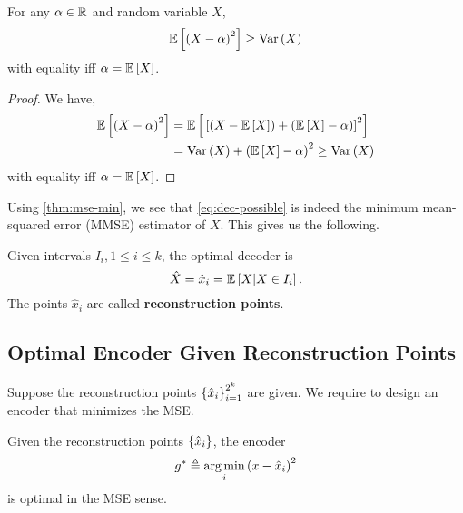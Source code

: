 \documentclass[twoside]{article}
\begin{document}
\begin{theorem}
    \label{thm:mse-min}
    For any \(\alpha\in\mathbb R\) and random variable \(X\),
    \begin{equation}
        \mathbb{E}\left[ \left(X-\alpha\right)^2 \right] \ge \mathrm{Var}\left(X\right)
        \label{eq:var-mse}
    \end{equation}
    with equality iff \(\alpha = \mathbb{E}\left[ X \right]\).
\end{theorem}

\begin{proof}
    We have,
    \begin{align}
        \mathbb{E}\left[ \left(X-\alpha\right)^2 \right] &= \mathbb{E}\left[ {}\left[\left(X-\mathbb{E}\left[ X \right]\right)+\left(\mathbb{E}\left[ X \right]-\alpha\right)\right]^2 \right] \\
                                 &= \mathrm{Var}\left(X\right) + \left(\mathbb{E}\left[ X \right]-\alpha\right)^2
                                 \ge \mathrm{Var}\left(X\right)
    \end{align}
    with equality iff \(\alpha = \mathbb{E}\left[ X \right]\).
\end{proof}

Using \autoref{thm:mse-min}, we see that \eqref{eq:dec-possible} is indeed the minimum mean-squared error (MMSE) estimator of \(X\). This gives us the following.

\begin{theorem}
    \label{thm:opt-dec-int}
    Given intervals \(I_i, 1 \le i \le k\), the optimal decoder is
    \begin{equation}
        \hat{X} = \hat{x}_i = \mathbb{E}\left[ X|X\in I_i \right].
        \label{eq:dec-k-bits}
    \end{equation}
    The points \(\hat{x}_i\) are called \textbf{reconstruction points}.
\end{theorem}

\subsection{Optimal Encoder Given Reconstruction Points}

Suppose the reconstruction points \(\left\{\hat{x}_i\right\}_{i=1}^{2^k}\) are given. We require to design an encoder that minimizes the MSE.

\begin{theorem}
    \label{thm:opt-enc-rp}
    Given the reconstruction points \(\left\{\hat{x}_i\right\}\), the encoder
    \begin{equation}
        g^{*} \triangleq \operatorname*{arg\,min}_i\left(x-\hat{x}_i\right)^2
        \label{eq:g-min-def}
    \end{equation}
    is optimal in the MSE sense.
\end{theorem}
\end{document}
